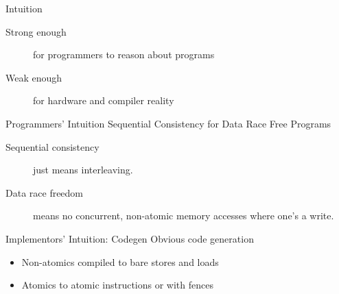 \documentclass[notes]{beamer}
\begin{document}
\begin{frame}{Intuition}
  \begin{description}
  \item[Strong enough] for programmers to reason about programs
  \item[Weak enough] for hardware and compiler reality
  \end{description}

\end{frame}

\begin{frame}{Programmers' Intuition}
  Sequential Consistency for Data Race Free Programs

  \begin{description}
  \item[Sequential consistency] just means interleaving.
  \item[Data race freedom] means no concurrent, non-atomic memory accesses where one's a write.
  \end{description}

\end{frame}

\begin{frame}{Implementors' Intuition: Codegen}
  Obvious code generation
  \begin{itemize}
  \item Non-atomics compiled to bare stores and loads
  \item Atomics to atomic instructions or with fences
  \end{itemize}
\end{frame}
\end{document}
